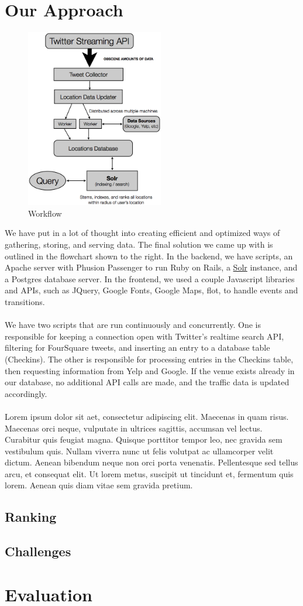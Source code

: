 \documentclass{article}
\begin{document}
\section{Our Approach}
\begin{figure}
\includegraphics[width=6cm]{flowchart.png}
\caption{Workflow}
\end{figure}
We have put in a lot of thought into creating efficient and optimized ways of gathering, storing, and serving data. The final solution
we came up with is outlined in the flowchart shown to the right. In the backend, we have scripts, an Apache server with Phusion Passenger
to run Ruby on Rails, a \href{http://lucene.apache.org/solr/}{Solr} instance, and a Postgres database server. In the frontend, we used
a couple Javascript libraries and APIs, such as JQuery, Google Fonts, Google Maps, flot, to handle events and transitions. 
\\ \\
We have two scripts that are run continuously and concurrently. One is responsible for keeping a connection open with Twitter's realtime
search API, filtering for FourSquare tweets, and inserting an entry to a database table (Checkins). The other is responsible for processing
entries in the Checkins table, then requesting information from Yelp and Google. If the venue exists already in our database, no additional
API calls are made, and the traffic data is updated accordingly. 
\\ \\
Lorem ipsum dolor sit aet, consectetur adipiscing elit. Maecenas in quam risus. Maecenas orci neque, vulputate in ultrices sagittis, accumsan vel lectus. Curabitur quis feugiat magna. Quisque porttitor tempor leo, nec gravida sem vestibulum quis. Nullam viverra nunc ut felis volutpat ac ullamcorper velit dictum. Aenean bibendum neque non orci porta venenatis. Pellentesque sed tellus arcu, et consequat elit. Ut lorem metus, suscipit ut tincidunt et, fermentum quis lorem. Aenean quis diam vitae sem gravida pretium.

\subsection{Ranking}
\subsection{Challenges}

\section{Evaluation}
\end{document}
